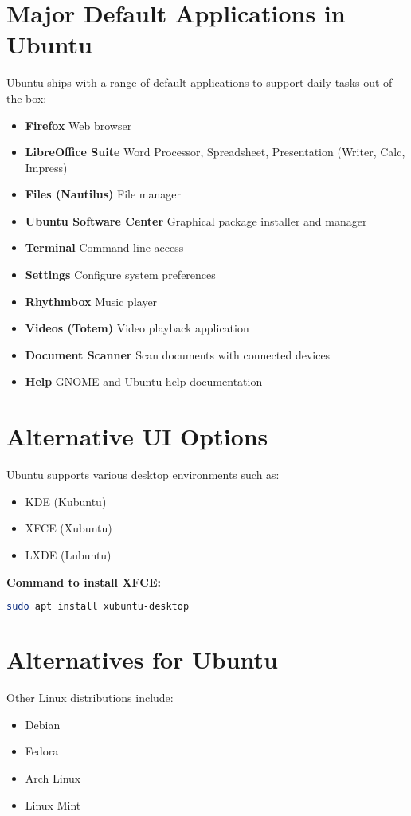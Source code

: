 \documentclass[12pt]{article}
\begin{document}
\section{Major Default Applications in Ubuntu}

Ubuntu ships with a range of default applications to support daily tasks out of the box:

\begin{itemize}
    \item \textbf{Firefox} \textendash{} Web browser
    \item \textbf{LibreOffice Suite} \textendash{} Word Processor, Spreadsheet, Presentation (Writer, Calc, Impress)
    \item \textbf{Files (Nautilus)} \textendash{} File manager
    \item \textbf{Ubuntu Software Center} \textendash{} Graphical package installer and manager
    \item \textbf{Terminal} \textendash{} Command-line access
    \item \textbf{Settings} \textendash{} Configure system preferences
    \item \textbf{Rhythmbox} \textendash{} Music player
    \item \textbf{Videos (Totem)} \textendash{} Video playback application
    \item \textbf{Document Scanner} \textendash{} Scan documents with connected devices
    \item \textbf{Help} \textendash{} GNOME and Ubuntu help documentation
\end{itemize}

\section{Alternative UI Options}
Ubuntu supports various desktop environments such as:
\begin{itemize}
    \item KDE (Kubuntu)
    \item XFCE (Xubuntu)
    \item LXDE (Lubuntu)
\end{itemize}

\textbf{Command to install XFCE:}
\begin{lstlisting}[language=bash]
sudo apt install xubuntu-desktop
\end{lstlisting}

\section{Alternatives for Ubuntu}
Other Linux distributions include:
\begin{itemize}
    \item Debian
    \item Fedora
    \item Arch Linux
    \item Linux Mint
\end{itemize}
\end{document}
